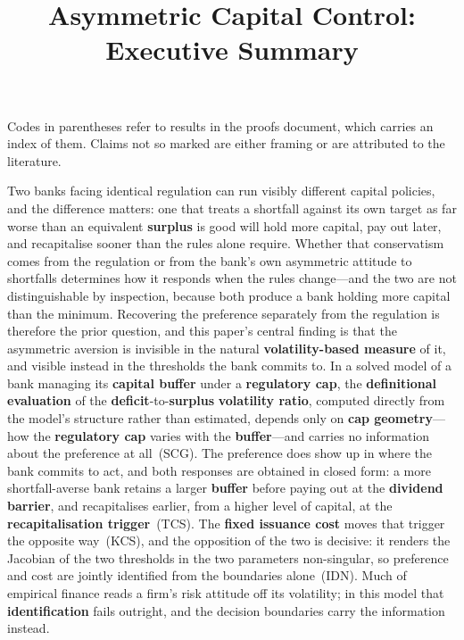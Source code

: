 \documentclass[11pt]{article}
\title{Asymmetric Capital Control: Executive Summary}
\date{}
\begin{document}
\maketitle
\thispagestyle{empty}

\noindent
Codes in parentheses refer to results in the proofs document, which
carries an index of them. Claims not so marked are either framing or are
attributed to the literature.

\bigskip

Two banks facing identical regulation can run visibly different capital
policies, and the difference matters: one that treats a shortfall against
its own target as far worse than an equivalent \textbf{surplus} is good will hold
more capital, pay out later, and recapitalise sooner than the rules alone
require. Whether that conservatism comes from the regulation or from the
bank's own asymmetric attitude to shortfalls determines how it responds
when the rules change---and the two are not distinguishable by inspection,
because both produce a bank holding more capital than the minimum.
Recovering the preference separately from the regulation is therefore the
prior question, and this paper's central finding is that the asymmetric
aversion is invisible in the natural \textbf{volatility-based measure} of it, and
visible instead in the thresholds the bank commits to. In a solved model
of a bank managing its \textbf{capital buffer} under a \textbf{regulatory cap}, the
\textbf{definitional evaluation} of the \textbf{deficit}-to-\textbf{surplus} \textbf{volatility ratio},
computed directly from the model's structure rather than estimated,
depends only on \textbf{cap geometry}---how the \textbf{regulatory cap} varies with the
\textbf{buffer}---and carries no information about the preference at all~(SCG). The
preference does show up in where the bank commits to act, and both
responses are obtained in closed form: a more shortfall-averse bank
retains a larger \textbf{buffer} before paying out at the \textbf{dividend barrier},
and recapitalises earlier, from a higher level of capital, at the
\textbf{recapitalisation trigger}~(TCS). The \textbf{fixed issuance cost} moves that
trigger the opposite way~(KCS), and the opposition of the two is
decisive: it renders the Jacobian of the two thresholds in the two
parameters non-singular, so preference and cost are jointly identified
from the boundaries alone~(IDN). Much of empirical finance reads a firm's
risk attitude off its volatility; in this model that \textbf{identification}
fails outright, and the decision boundaries carry the information
instead.
\end{document}
